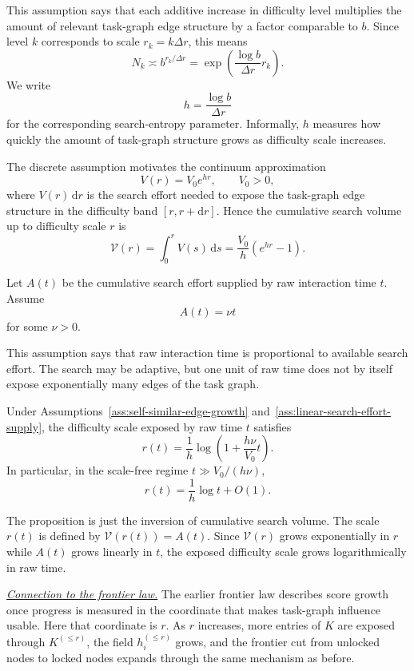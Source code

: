 This assumption says that each additive increase in difficulty level multiplies the amount of relevant task-graph edge structure by a factor comparable to \(b\). Since level \(k\) corresponds to scale \(r_k=k\Delta r\), this means
\[
    N_k
    \asymp
    b^{r_k/\Delta r}
    =
    \exp\left(\frac{\log b}{\Delta r}r_k\right).
\]
We write
\[
    h=\frac{\log b}{\Delta r}
\]
for the corresponding search-entropy parameter. Informally, \(h\) measures how quickly the amount of task-graph structure grows as difficulty scale increases.

The discrete assumption motivates the continuum approximation
\[
    V(r)=V_0e^{hr},
    \qquad V_0>0,
\]
where \(V(r)\,\mathrm dr\) is the search effort needed to expose the task-graph edge structure in the difficulty band \([r,r+\mathrm dr]\). Hence the cumulative search volume up to difficulty scale \(r\) is
\[
    \mathcal V(r)
    =
    \int_0^r V(s)\,\mathrm ds
    =
    \frac{V_0}{h}(e^{hr}-1).
\]

\begin{assumption}
\label{ass:linear-search-effort-supply}
Let \(A(t)\) be the cumulative search effort supplied by raw interaction time \(t\). Assume
\[
    A(t)=\nu t
\]
for some \(\nu>0\).
\end{assumption}

This assumption says that raw interaction time is proportional to available search effort. The search may be adaptive, but one unit of raw time does not by itself expose exponentially many edges of the task graph.

\begin{proposition}
\label{prop:self-similar-log-time}
Under Assumptions~\ref{ass:self-similar-edge-growth} and~\ref{ass:linear-search-effort-supply}, the difficulty scale exposed by raw time \(t\) satisfies
\[
    r(t)
    =
    \frac1h
    \log\left(1+\frac{h\nu}{V_0}t\right).
\]
In particular, in the scale-free regime \(t\gg V_0/(h\nu)\),
\[
    r(t)=\frac1h\log t+O(1).
\]
\end{proposition}

The proposition is just the inversion of cumulative search volume. The scale \(r(t)\) is defined by \(\mathcal V(r(t))=A(t)\). Since \(\mathcal V(r)\) grows exponentially in \(r\) while \(A(t)\) grows linearly in \(t\), the exposed difficulty scale grows logarithmically in raw time.

\underline{\textit{Connection to the frontier law.}}
The earlier frontier law describes score growth once progress is measured in the coordinate that makes task-graph influence usable. Here that coordinate is \(r\). As \(r\) increases, more entries of \(K\) are exposed through \(K^{(\le r)}\), the field \(h_i^{(\le r)}\) grows, and the frontier cut from unlocked nodes to locked nodes expands through the same mechanism as before.

